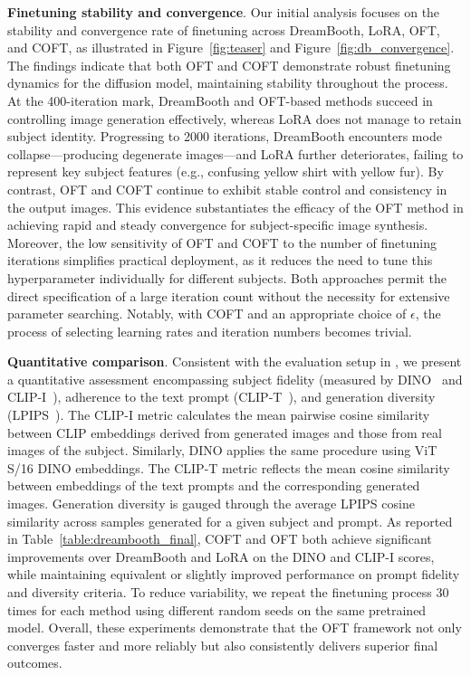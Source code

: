 \textbf{Finetuning stability and convergence}. Our initial analysis focuses on the stability and convergence rate of finetuning across DreamBooth, LoRA, OFT, and COFT, as illustrated in Figure~\ref{fig:teaser} and Figure~\ref{fig:db_convergence}. The findings indicate that both OFT and COFT demonstrate robust finetuning dynamics for the diffusion model, maintaining stability throughout the process. At the 400-iteration mark, DreamBooth and OFT-based methods succeed in controlling image generation effectively, whereas LoRA does not manage to retain subject identity. Progressing to 2000 iterations, DreamBooth encounters mode collapse—producing degenerate images—and LoRA further deteriorates, failing to represent key subject features (e.g., confusing yellow shirt with yellow fur). By contrast, OFT and COFT continue to exhibit stable control and consistency in the output images. This evidence substantiates the efficacy of the OFT method in achieving rapid and steady convergence for subject-specific image synthesis. Moreover, the low sensitivity of OFT and COFT to the number of finetuning iterations simplifies practical deployment, as it reduces the need to tune this hyperparameter individually for different subjects. Both approaches permit the direct specification of a large iteration count without the necessity for extensive parameter searching. Notably, with COFT and an appropriate choice of $\epsilon$, the process of selecting learning rates and iteration numbers becomes trivial.

\textbf{Quantitative comparison}. Consistent with the evaluation setup in \cite{ruiz2023dreambooth}, we present a quantitative assessment encompassing subject fidelity (measured by DINO~\cite{caron2021emerging} and CLIP-I~\cite{radford2021learning}), adherence to the text prompt (CLIP-T~\cite{radford2021learning}), and generation diversity (LPIPS~\cite{zhang2018unreasonable}). The CLIP-I metric calculates the mean pairwise cosine similarity between CLIP embeddings derived from generated images and those from real images of the subject. Similarly, DINO applies the same procedure using ViT S/16 DINO embeddings. The CLIP-T metric reflects the mean cosine similarity between embeddings of the text prompts and the corresponding generated images. Generation diversity is gauged through the average LPIPS cosine similarity across samples generated for a given subject and prompt. As reported in Table~\ref{table:dreambooth_final}, COFT and OFT both achieve significant improvements over DreamBooth and LoRA on the DINO and CLIP-I scores, while maintaining equivalent or slightly improved performance on prompt fidelity and diversity criteria. To reduce variability, we repeat the finetuning process 30 times for each method using different random seeds on the same pretrained model. Overall, these experiments demonstrate that the OFT framework not only converges faster and more reliably but also consistently delivers superior final outcomes.

